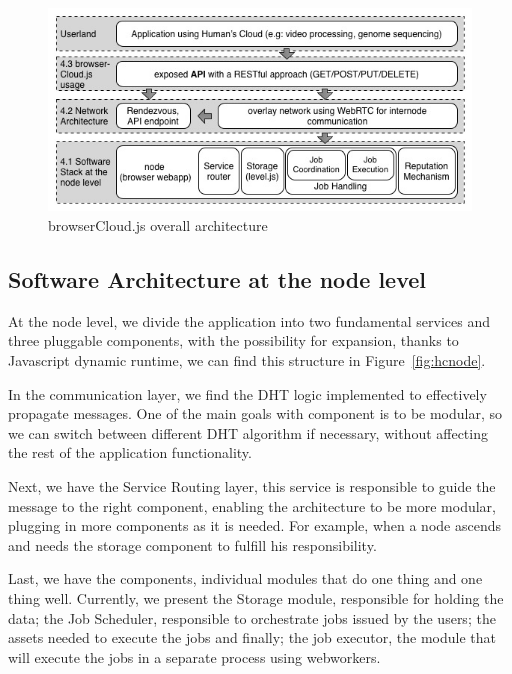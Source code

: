 \begin{figure}[h!]
  \centering
  \includegraphics[width=\textwidth]{img/softwarestack.jpg}
  \caption{browserCloud.js overall architecture}
  \label{fig:softwarestack}
\end{figure}


\subsection{Software Architecture at the node level}

At the node level, we divide the application into two fundamental services and three pluggable components, with the possibility for expansion, thanks to Javascript dynamic runtime, we can find this structure in Figure~\ref{fig:hcnode}.

In the communication layer, we find the DHT logic implemented to effectively propagate messages. One of the main goals with component is to be modular, so we can switch between different DHT algorithm if necessary, without affecting the rest of the application functionality.

Next, we have the Service Routing layer, this service is responsible to guide the message to the right component, enabling the architecture to be more modular, plugging in more components as it is needed. For example, when a node ascends and needs the storage component to fulfill his responsibility.

Last, we have the components, individual modules that do one thing and one thing well. Currently, we present the Storage module, responsible for holding the data; the Job Scheduler, responsible to orchestrate jobs issued by the users; the assets needed to execute the jobs and finally; the job executor, the module that will execute the jobs in a separate process using webworkers.



